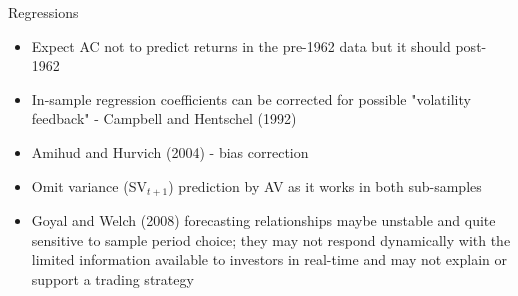 \documentclass{beamer}
\begin{document}
\begin{frame}{Regressions}
	\begin{itemize}[<+->]
		\item Expect AC not to predict returns in the pre-1962 data but it should post-1962
		\item In-sample regression coefficients can be corrected for possible "volatility feedback" -  Campbell and
		Hentschel (1992)
		\item Amihud and Hurvich (2004) - bias correction
		\item Omit variance (SV$_{t+1}$) prediction by AV as it works in both sub-samples
		\item Goyal and Welch (2008) forecasting relationships maybe unstable and quite sensitive to sample period choice; they may not respond dynamically with the limited information available to investors in real-time and may not explain or support a trading strategy
	\end{itemize}
\end{frame}

%			

%			
%		
\end{document}
